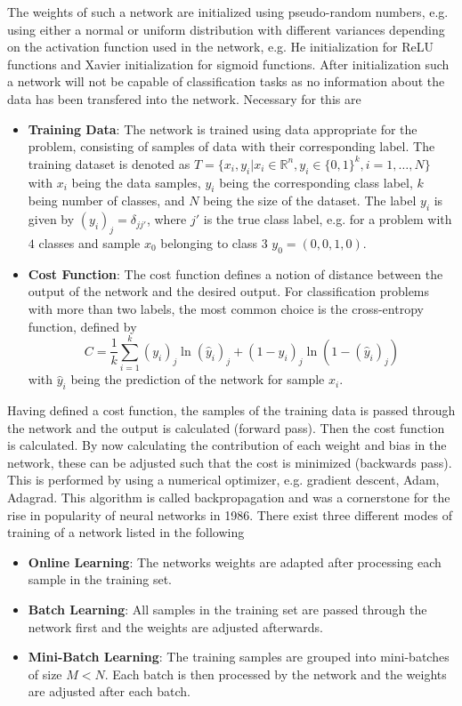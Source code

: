 The weights of such a network are initialized using pseudo-random numbers, e.g. using either a normal or uniform distribution with different variances depending on the activation function used in the network, e.g. He initialization \cite{He2015} for ReLU functions and Xavier initialization \cite{Glorot2010} for sigmoid functions. After initialization such a network will not be capable of classification tasks as no information about the data has been transfered into the network. Necessary for this are 
\begin{itemize}
\item \textbf{Training Data}: The network is trained using data appropriate for the problem, consisting of samples of data with their corresponding label. The training dataset is denoted as $T = \{x_i, y_i | x_i\in \mathbb{R}^n, y_i \in \{0,1\}^k, i=1,\dots,N\}$ with $x_i$ being the data samples, $y_i$ being the corresponding class label, $k$ being number of classes, and $N$ being the size of the dataset. The label $y_i$ is given by $(y_i)_j=\delta_{jj'}$, where  $j'$ is the true class label, e.g. for a problem with $4$ classes and sample $x_0$ belonging to class $3$ $y_0 = (0,0,1,0)$.
\item \textbf{Cost Function}: The cost function defines a notion of distance between the output of the network and the desired output. For classification problems with more than two labels, the most common choice is the cross-entropy function, defined by
\begin{equation}
C = \frac{1}{k} \sum_{i=1}^k (y_i)_j \ln{(\hat{y}_i)_j} + (1-y_i)_j \ln{(1-(\hat{y}_i)_j)} 
\end{equation}
with $\hat{y}_i$ being the prediction of the network for sample $x_i$.
\end{itemize}
Having defined a cost function, the samples of the training data is passed through the network and the output is calculated (forward pass). Then the cost function is calculated. By now calculating the contribution of each weight and bias in the network, these can be adjusted such that the cost is minimized (backwards pass). This is performed by using a numerical optimizer, e.g. gradient descent, Adam, Adagrad. This algorithm is called backpropagation \cite{Rumelhart1986} and was a cornerstone for the rise in popularity of neural networks in 1986. There exist three different modes of training of a network listed in the following
\begin{itemize}
\item \textbf{Online Learning}: The networks weights are adapted after processing each sample in the training set.
\item \textbf{Batch Learning}: All samples in the training set are passed through the network first and the weights are adjusted afterwards.
\item \textbf{Mini-Batch Learning}: The training samples are grouped into mini-batches of size $M<N$. Each batch is then processed by the network and the weights are adjusted after each batch.
\end{itemize}
